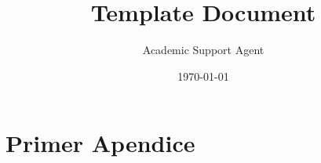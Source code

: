 \documentclass{article}
\title{Template Document}
\author{Academic Support Agent}
\date{\today}
\begin{document}
\maketitle

\addtolength{\topmargin}{-0.5cm}
\addtolength{\headsep}{0.2cm}






\printbibliography %


\section{Primer Apendice}
\lipsum[2-3]
\end{document}
